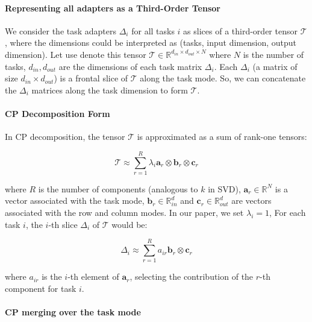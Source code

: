 \documentclass[10pt]{article} %
\begin{document}
    \paragraph{Representing all adapters as a Third-Order Tensor}
    
    We consider the task adapters $\Delta_{i}$ for all tasks $i$ as slices of a
    third-order tensor $\mathcal{T}$, where the dimensions could be interpreted
    as (tasks, input dimension, output dimension). Let use denote this tensor $\mathcal{T}
    \in\mathbb{R}^{d_{in}\times d_{out}\times N}$ where $N$ is the number of tasks,
    $d_{in}, d_{out}$ are the dimensions of each task matrix $\Delta_{i}$. Each $\Delta
    _{i}$ (a matrix of size $d_{in}\times d_{out}$) is a frontal slice of $\mathcal{T}$
    along the task mode. So, we can concatenate the $\Delta_{i}$ matrices along the
    task dimension to form $\mathcal{T}$.

    
    \paragraph{CP Decomposition Form}

    In CP decomposition, the tensor $\mathcal{T}$ is approximated as a sum of rank-one
    tensors:

    \begin{equation}
        \label{eq:cp_decomposition}\mathcal{T}\approx \sum_{r=1}^{R}\lambda_i\mathbf{a}_{r}
        \otimes \mathbf{b}_{r}\otimes \mathbf{c}_{r}
    \end{equation}

    where $R$ is the number of components (analogous to $k$ in SVD), $\mathbf{a}_{r}
    \in \mathbb{R}^{N}$ is a vector associated with the task mode,
    $\textbf{b}_{r}\in \mathbb{R}^{d}_{in}$ and
    $\textbf{c}_{r}\in \mathbb{R}^{d}_{out}$ are vectors associated with the row
    and column modes. In our paper, we set $\lambda_i=1$, For each task $i$, the $i$-th slice $\Delta_{i}$ of
    $\mathcal{T}$ would be:

    \begin{equation}
        \label{eq:cp_form}
        \Delta_{i}\approx \sum_{r=1}^{R}a_{ir}\mathbf{b}_{r}\otimes
        \mathbf{c}_{r}
    \end{equation}

    where $a_{ir}$ is the $i$-th element of $\mathbf{a}_{r}$, selecting the
    contribution of the $r$-th component for task $i$.

    \paragraph{CP merging over the task mode}
\end{document}
